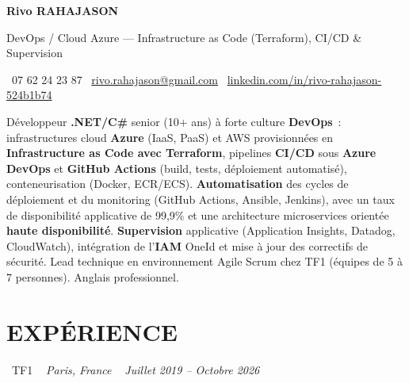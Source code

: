 \documentclass[10pt,a4paper]{article}
\begin{document}
\begin{center}
{\Huge \textbf{\color{ink}Rivo RAHAJASON}}

\vspace{4pt}

{\large \color{primary} DevOps / Cloud Azure --- Infrastructure as Code (Terraform), CI/CD \& Supervision}

\vspace{6pt}

\color{darkgray} \faPhone\  07 62 24 23 87 \quad
\color{darkgray} \faEnvelope\ \href{mailto:rivo.rahajason@gmail.com}{rivo.rahajason@gmail.com} \quad
\color{darkgray} \faLinkedin\ \href{https://linkedin.com/in/rivo-rahajason-524b1b74}{linkedin.com/in/rivo-rahajason-524b1b74}

\vspace{10pt}

\begin{minipage}{\textwidth}
\small\color{darkgray}
Développeur \textbf{.NET/C\#} senior (10+ ans) à forte culture \textbf{DevOps}~: infrastructures cloud \textbf{Azure} (IaaS, PaaS) et AWS provisionnées en \textbf{Infrastructure as Code avec Terraform}, pipelines \textbf{CI/CD} sous \textbf{Azure DevOps} et \textbf{GitHub Actions} (build, tests, déploiement automatisé), conteneurisation (Docker, ECR/ECS). \textbf{Automatisation} des cycles de déploiement et du monitoring (GitHub Actions, Ansible, Jenkins), avec un taux de disponibilité applicative de 99,9\% et une architecture microservices orientée \textbf{haute disponibilité}. \textbf{Supervision} applicative (Application Insights, Datadog, CloudWatch), intégration de l'\textbf{IAM} OneId et mise à jour des correctifs de sécurité. Lead technique en environnement Agile Scrum chez TF1 (équipes de 5 à 7 personnes). Anglais professionnel.
\end{minipage}

\vspace{16pt}
\end{center}

\section*{EXPÉRIENCE}

\noindent\textcolor{primary}{ \faBuilding\ TF1} \quad
\textit{ \small \textcolor{darkgray}{ \faMapMarker\ } Paris, France } \hfill
\textit{ \small \textcolor{darkgray}{ \faCalendar\ } Juillet 2019 -- Octobre 2026 }
\end{document}
